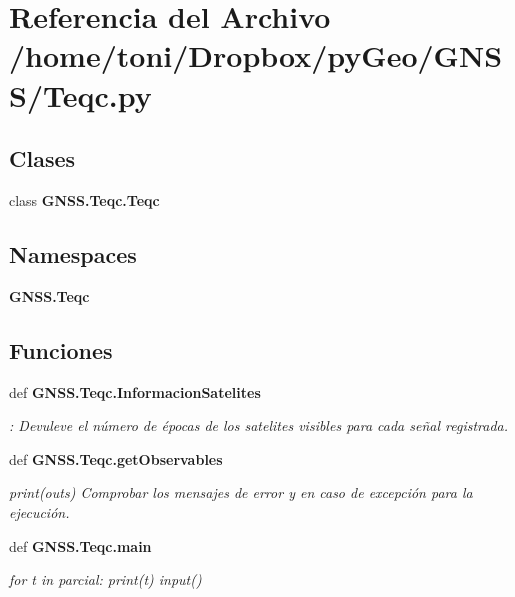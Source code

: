 \section{Referencia del Archivo /home/toni/\-Dropbox/py\-Geo/\-G\-N\-S\-S/\-Teqc.py}
\label{Teqc_8py}
\subsection*{Clases}
\begin{DoxyCompactItemize}
\item 
class {\bf G\-N\-S\-S.\-Teqc.\-Teqc}
\end{DoxyCompactItemize}
\subsection*{Namespaces}
\begin{DoxyCompactItemize}
\item 
{\bf G\-N\-S\-S.\-Teqc}
\end{DoxyCompactItemize}
\subsection*{Funciones}
\begin{DoxyCompactItemize}
\item 
def {\bf G\-N\-S\-S.\-Teqc.\-Informacion\-Satelites}
\begin{DoxyCompactList}\small\item\em \-: Devuleve el número de épocas de los satelites visibles para cada señal registrada. \end{DoxyCompactList}\item 
def {\bf G\-N\-S\-S.\-Teqc.\-get\-Observables}
\begin{DoxyCompactList}\small\item\em print(outs) Comprobar los mensajes de error y en caso de excepción para la ejecución. \end{DoxyCompactList}\item 
def {\bf G\-N\-S\-S.\-Teqc.\-main}
\begin{DoxyCompactList}\small\item\em for t in parcial\-: print(t) input() \end{DoxyCompactList}\end{DoxyCompactItemize}
